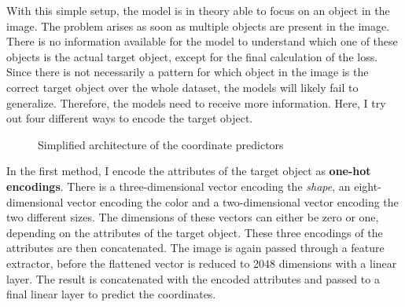 With this simple setup, the model is in theory able to focus on an object in the image.
The problem arises as soon as multiple objects are present in the image.
There is no information available for the model to understand which one of these objects is the actual target object, except for the final calculation of the loss.
Since there is not necessarily a pattern for which object in the image is the correct target object over the whole dataset, the models will likely fail to generalize. 
Therefore, the models need to receive more information.
Here, I try out four different ways to encode the target object.


\begin{figure}[h]
    \centering
    \caption{Simplified architecture of the coordinate predictors}
\end{figure}

In the first method, I encode the attributes of the target object as \textbf{one-hot encodings}.
There is a three-dimensional vector encoding the \emph{shape}, an eight-dimensional vector encoding the color and a two-dimensional vector encoding the two different sizes.
The dimensions of these vectors can either be zero or one, depending on the attributes of the target object.
These three encodings of the attributes are then concatenated.
The image is again passed through a feature extractor, before the flattened vector is reduced to 2048 dimensions with a linear layer.
The result is concatenated with the encoded attributes and passed to a final linear layer to predict the coordinates.

